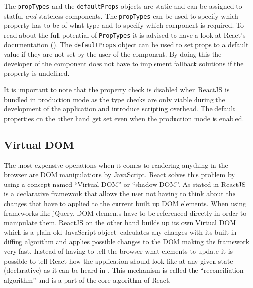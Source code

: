 The \texttt{propTypes} and the \texttt{defaultProps} objects are static and can be assigned to statful \emph{and} stateless components. The \texttt{propTypes} can be used to specify which property has to be of what type and to specify which component is required. To read about the full potential of \texttt{PropTypes} it is advised to have a look at React's documentation (\cite[Typechecking With PropTypes]{FacebookInc.2013}). The \texttt{defaultProps} object can be used to set props to a default value if they are not set by the user of the component. By doing this the developer of the component does not have to implement fallback solutions if the property is undefined.

It is important to note that the property check is disabled when ReactJS is bundled in production mode as the type checks are only viable during the development of the application and introduce scripting overhead. The default properties on the other hand get set even when the production mode is enabled.

\subsection{Virtual DOM} 
\label{ssec:VirtualDom}


The most expensive operations when it comes to rendering anything in the browser are DOM manipulations by JavaScript. React solves this problem by using a concept named \enquote{Virtual DOM} or \enquote{shadow DOM}. As stated in \cite[Docs: Reconciliation]{FacebookInc.2013} ReactJS is a declarative framework that allows the user not having to think about the changes that have to applied to the current built up DOM elements. When using frameworks like jQuery, DOM elements have to be referenced directly in order to manipulate them. ReactJS on the other hand builds up its own Virtual DOM which is a plain old JavaScript object, calculates any changes with its built in diffing algorithm and applies possible changes to the DOM making the framework very fast. Instead of having to tell the browser what elements to update it is possible to tell React how the application should look like at any given state (declarative) as it can be heard in \cite[1:50]{youtube.2017}. This mechanism is called the \enquote{reconciliation algorithm} and is a part of the core algorithm of React.

